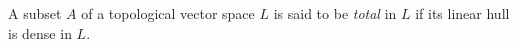 A subset \(A\) of a topological vector space \(L\) is said to be \textit{total} in \(L\) if its linear hull is dense in \(L\).
